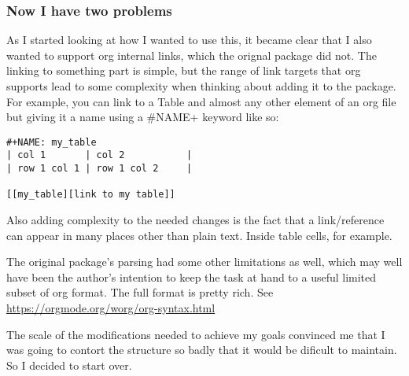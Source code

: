 \documentclass[11pt]{article}
\begin{document}
\subsubsection{Now I have two problems  }
 \label{obj-197}
 \label{obj-196}
  As I started looking at how I wanted to use this, it became clear that I also wanted to
  support org internal links, which the orignal package did not. The linking to something
  part is simple, but the range of link targets that org supports lead to some complexity
  when thinking about adding it to the package. For example, you can link to a Table and
  almost any other element of an org file but giving it a name using a \#NAME+ keyword like so:

\begin{verbatim}
#+NAME: my_table
| col 1       | col 2           |
| row 1 col 1 | row 1 col 2     |

[[my_table][link to my table]]  
\end{verbatim}
\vspace{\baselineskip}
  Also adding complexity to the needed changes is the fact that a link/reference can
  appear in many places other than plain text. Inside table cells, for example.

  The original package's parsing had some other limitations as well, which may well have
  been the author's intention to keep the task at hand to a useful limited subset of org
format. The full format is pretty rich. See
\href{https://orgmode.org/worg/org-syntax.html}{https://orgmode.org/worg/org-syntax.html}

\vspace{\baselineskip}
  The scale of the modifications needed to achieve my goals convinced me that I was going
  to contort the structure so badly that it would be dificult to maintain. So I decided
  to start over.
\vspace{\baselineskip}

\printindex
\end{document}
